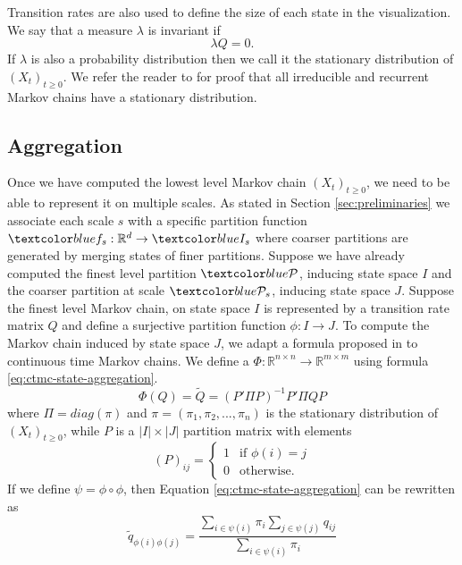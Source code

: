Transition rates are also used to define the size of each state in the visualization. We say that a measure
$\lambda$ is invariant if
\begin{equation}
	\nonumber
	\lambda Q = 0.
\end{equation}
If $\lambda$ is also a probability distribution then we call it the stationary distribution of $(X_t)_{t \ge 0}$.
We refer the reader to \cite{norris1998markov} for proof that all irreducible and recurrent Markov chains have
a stationary distribution.

\subsection{Aggregation}

Once we have computed the lowest level Markov chain $(X_t)_{t \ge 0}$, we need to be able to represent it on multiple scales.
As stated in Section \ref{sec:preliminaries} we associate each scale $s$ with a specific partition function
$\lstopar{f_s}: \mathbb{R}^d \rightarrow \lstopar{I_s}$ where coarser partitions are generated by merging 
states of finer partitions.
Suppose we have already computed the finest level partition $\lstopar{\cP}$, inducing state space $I$ and the
coarser partition at scale $\lstopar{\cP_s}$, inducing state space $J$. Suppose the finest level Markov chain,
on state space $I$ is represented by a transition rate matrix $Q$ and define a surjective partition function
$\phi: I \rightarrow J$. To compute the Markov chain induced by state space $J$, we adapt a formula proposed
in \cite{5746509} to continuous time Markov chains. We define a 
$\Phi: \mathbb{R}^{n \times n} \rightarrow \mathbb{R}^{m \times m}$ using formula \ref{eq:ctmc-state-aggregation}.
\begin{equation}
	\label{eq:ctmc-state-aggregation}
	\Phi(Q) = \tilde{Q} = (P' \Pi P)^{-1} P' \Pi Q P
\end{equation}
where $\Pi = diag(\pi)$ and $\pi = (\pi_1, \pi_2, ..., \pi_n)$ is the stationary distribution of $(X_t)_{t \ge 0}$, while $P$ is a 
$|I| \times |J|$ partition matrix with elements
\begin{equation}
	\nonumber
	\left(P\right)_{ij} = 
		\left\{
			\begin{array}{ll}
				1 & \mbox{if } \phi(i) = j \\
				0 & \mbox{otherwise}.
			\end{array}
		\right.
\end{equation}
If we define $\psi = \phi \circ \phi$, then Equation \ref{eq:ctmc-state-aggregation} can be rewritten as
\begin{equation}
	\nonumber
	\tilde{q}_{\phi(i)\phi(j)} = \frac{\sum\limits_{i \in \psi(i)}\pi_i \sum\limits_{j \in \psi(j)} q_{ij}}{\sum\limits_{i \in \psi(i)}\pi_i}
\end{equation}